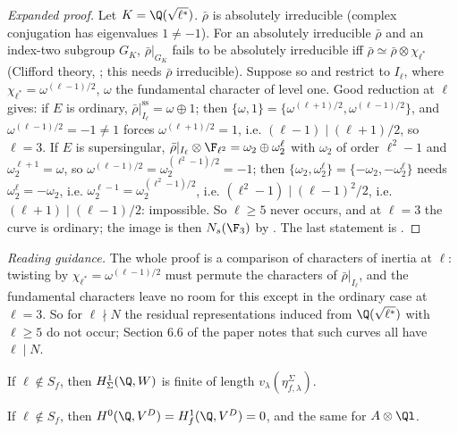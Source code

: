 \begin{sloppypar}
\begin{proof}[Expanded proof]
Let $K=\Q(\sqrt{\ell^*})$. $\bar\rho$ is absolutely irreducible (complex conjugation has eigenvalues $1\ne-1$). For an absolutely irreducible $\bar\rho$ and an index-two subgroup $G_K$,
$\bar\rho|_{G_K}$ fails to be absolutely irreducible iff $\bar\rho\simeq\bar\rho\otimes\chi_{\ell^*}$ (Clifford theory, ; this needs $\bar\rho$ irreducible). Suppose so and restrict to $I_\ell$,
where $\chi_{\ell^*}=\omega^{(\ell-1)/2}$, $\omega$ the fundamental character of level one. Good reduction at $\ell$ gives: if $E$ is ordinary, $\bar\rho|_{I_\ell}^{\mathrm{ss}}=\omega\oplus1$; then
$\{\omega,1\}=\{\omega^{(\ell+1)/2},\omega^{(\ell-1)/2}\}$, and $\omega^{(\ell-1)/2}=-1\ne1$ forces $\omega^{(\ell+1)/2}=1$, i.e. $(\ell-1)\mid(\ell+1)/2$, so $\ell=3$. If $E$ is supersingular, $\bar\rho|_{I_\ell}\otimes\F_{\ell^2}=\omega_2\oplus\omega_2^\ell$
with $\omega_2$ of order $\ell^2-1$ and $\omega_2^{\ell+1}=\omega$, so $\omega^{(\ell-1)/2}=\omega_2^{(\ell^2-1)/2}=-1$; then $\{\omega_2,\omega_2^\ell\}=\{-\omega_2,-\omega_2^\ell\}$ needs $\omega_2^\ell=-\omega_2$, i.e.
$\omega_2^{\ell-1}=\omega_2^{(\ell^2-1)/2}$, i.e. $(\ell^2-1)\mid(\ell-1)^2/2$, i.e. $(\ell+1)\mid(\ell-1)/2$: impossible. So $\ell\ge5$ never occurs, and at $\ell=3$ the curve is ordinary; the image is
then $N_s(\F_3)$ by . The last statement is .
\end{proof}

\noindent\emph{Reading guidance.} The whole proof is a comparison of characters of inertia at $\ell$: twisting by $\chi_{\ell^*}=\omega^{(\ell-1)/2}$ must permute the characters of
$\bar\rho|_{I_\ell}$, and the fundamental characters leave no room for this except in the ordinary case at $\ell=3$. So for $\ell\nmid N$ the residual representations induced from
$\Q(\sqrt{\ell^*})$ with $\ell\ge5$ do not occur; Section 6.6 of the paper notes that such curves all have $\ell\mid N$.

\begin{theorem}\label{thm:paper:dfg37}
If $\ell\notin S_f$, then $H^1_\Sigma(\Q,W)$ is finite of length $v_\lambda(\eta^\Sigma_{f,\lambda})$.
\end{theorem}

\begin{theorem}\label{thm:paper:dfg27}
If $\ell\notin S_f$, then $H^0(\Q,V^D)=H^1_f(\Q,V^D)=0$, and the same for $A\otimes\Ql$.
\end{theorem}


\end{sloppypar}
